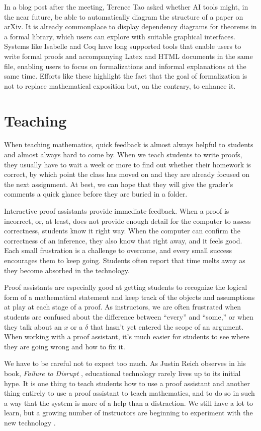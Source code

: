 \documentclass{amsart}
\theoremstyle{definition}
\theoremstyle{remark}
\numberwithin{equation}{section}
\begin{document}
In a blog post after the meeting, Terence Tao asked whether AI tools might, in the near future, be able to automatically diagram the structure of a paper on arXiv. It is already commonplace to display dependency diagrams for theorems in a formal library, which users can explore with suitable graphical interfaces. Systems like Isabelle and Coq have long supported tools that enable users to write formal proofs and accompanying Latex and HTML documents in the same file, enabling users to focus on formalizations and informal explanations at the same time. Efforts like these highlight the fact that the goal of formalization is not to replace mathematical exposition but, on the contrary, to enhance it.


\section{Teaching}

When teaching mathematics, quick feedback is almost always helpful to students and almost always hard to come by. When we teach students to write proofs, they usually have to wait a week or more to find out whether their homework is correct, by which point the class has moved on and they are already focused on the next assignment. At best, we can hope that they will give the grader's comments a quick glance before they are buried in a folder.

Interactive proof assistants provide immediate feedback. When a proof is incorrect, or, at least, does not provide enough detail for the computer to assess correctness, students know it right way. When the computer can confirm the correctness of an inference, they also know that right away, and it feels good. Each small frustration is a challenge to overcome, and every small success encourages them to keep going. Students often report that time melts away as they become absorbed in the technology.

Proof assistants are especially good at getting students to recognize the logical form of a mathematical statement and keep track of the objects and assumptions at play at each stage of a proof. As instructors, we are often frustrated when students are confused about the difference between ``every'' and ``some,'' or when they talk about an $x$ or a $\delta$ that hasn't yet entered the scope of an argument. When working with a proof assistant, it's much easier for students to see where they are going wrong and how to fix it.

We have to be careful not to expect too much. As Justin Reich observes in his book, \emph{Failure to Disrupt} \cite{reich:20}, educational technology rarely lives up to its initial hype. It is one thing to teach students how to use a proof assistant and another thing entirely to use a proof assistant to teach mathematics, and to do so in such a way that the system is more of a help than a distraction. We still have a lot to learn, but a growing number of instructors are beginning to experiment with the new technology \cite{kerjean:et:al:22}.
\end{document}
